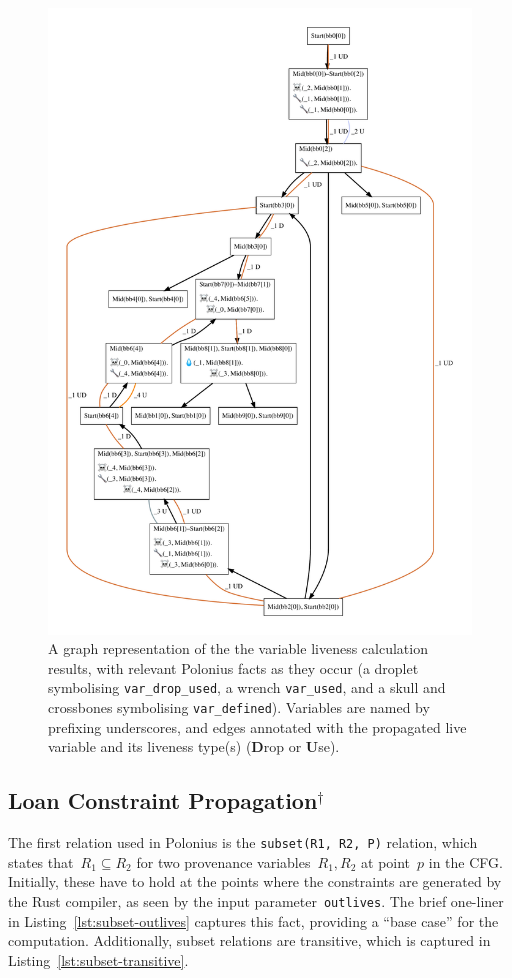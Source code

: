 \documentclass[11pt,a4paper,twoside,openany]{report}
\newcommand{\notmine}[0] {$^\dagger$}
\newcommand{\InDatalog}[1]{\texttt{#1}}
\begin{document}
\begin{figure}
  \includegraphics[width=0.9\linewidth]{Graphs/liveness.pdf}
  \caption{A graph representation of the the variable liveness calculation
    results, with relevant Polonius facts as they occur (a droplet symbolising
    \InDatalog{var_drop_used}, a wrench \InDatalog{var_used}, and a skull and
    crossbones symbolising \InDatalog{var_defined}). Variables are named by
    prefixing underscores, and edges annotated with the propagated live variable
    and its liveness type(s) (\textbf{D}rop or \textbf{U}se).}
  \label{fig:liveness-graph}
\end{figure}

\subsection{Loan Constraint Propagation\notmine{}}\label{sec:loan-constr-prop}

The first relation used in Polonius is the \InDatalog{subset(R1, R2, P)}
relation, which states that~$R_1 \subseteq R_2$ for two provenance
variables~$R_1, R_2$ at point~$p$ in the CFG. Initially, these have to hold at
the points where the constraints are generated by the Rust compiler, as seen by
the input parameter~\InDatalog{outlives}. The brief one-liner in
Listing~\ref{lst:subset-outlives} captures this fact, providing a ``base case''
for the computation. Additionally, subset relations are transitive, which is
captured in Listing~\ref{lst:subset-transitive}.
\end{document}
